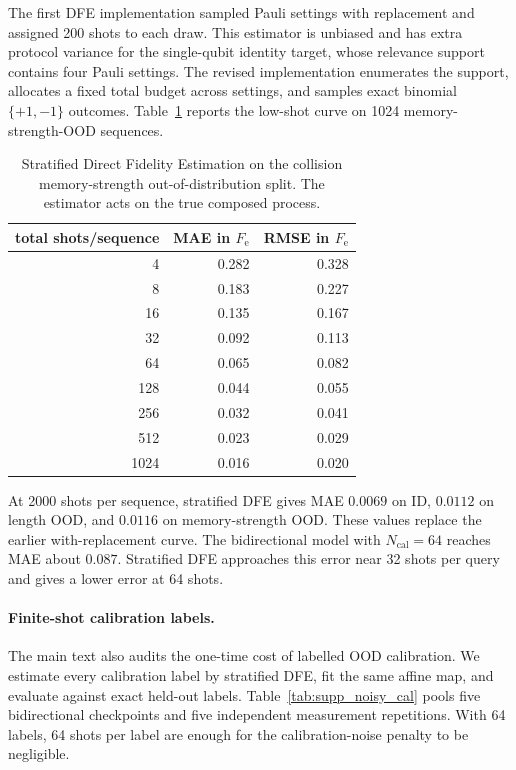 \documentclass[10pt]{article}
\begin{document}
The first DFE implementation sampled Pauli settings with replacement and assigned 200 shots to each draw. This estimator is unbiased and has extra protocol variance for the single-qubit identity target, whose relevance support contains four Pauli settings. The revised implementation enumerates the support, allocates a fixed total budget across settings, and samples exact binomial $\{+1,-1\}$ outcomes. Table~\ref{tab:supp_dfe} reports the low-shot curve on 1024 memory-strength-OOD sequences.

\begin{table}[h]
\centering
\caption{Stratified Direct Fidelity Estimation on the collision memory-strength out-of-distribution split. The estimator acts on the true composed process.}
\label{tab:supp_dfe}
\begin{tabular}{rrr}
\toprule
total shots/sequence & MAE in $F_{\mathrm e}$ & RMSE in $F_{\mathrm e}$ \\
\midrule
4 & 0.282 & 0.328 \\
8 & 0.183 & 0.227 \\
16 & 0.135 & 0.167 \\
32 & 0.092 & 0.113 \\
64 & 0.065 & 0.082 \\
128 & 0.044 & 0.055 \\
256 & 0.032 & 0.041 \\
512 & 0.023 & 0.029 \\
1024 & 0.016 & 0.020 \\
\bottomrule
\end{tabular}
\end{table}

At 2000 shots per sequence, stratified DFE gives MAE $0.0069$ on ID, $0.0112$ on length OOD, and $0.0116$ on memory-strength OOD. These values replace the earlier with-replacement curve. The bidirectional model with $N_{\mathrm{cal}}=64$ reaches MAE about $0.087$. Stratified DFE approaches this error near 32 shots per query and gives a lower error at 64 shots.

\paragraph*{Finite-shot calibration labels.}
The main text also audits the one-time cost of labelled OOD calibration. We estimate every calibration label by stratified DFE, fit the same affine map, and evaluate against exact held-out labels. Table~\ref{tab:supp_noisy_cal} pools five bidirectional checkpoints and five independent measurement repetitions. With 64 labels, 64 shots per label are enough for the calibration-noise penalty to be negligible.
\end{document}

